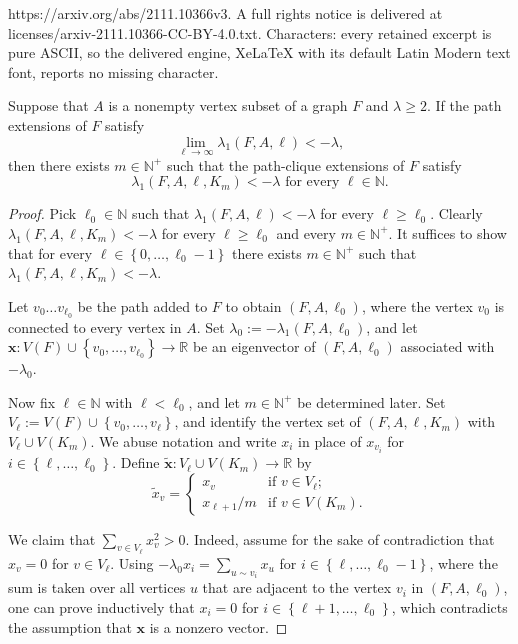 \documentclass[10pt,a4paper]{amsart}
\newcommand{\N}{\mathbb{N}}
\newcommand{\R}{\mathbb{R}}
\newcommand{\bx}{\bm{x}}
\newcommand{\la}{\lambda}
\newcommand{\sset}[1]{\left\{{#1}\right\}}
\newcommand{\tbx}{\tilde{\bx}}
\newcommand{\tx}{\tilde{x}}
\begin{document}
https://arxiv.org/abs/2111.10366v3. A full rights notice is delivered at licenses/arxiv-2111.10366-CC-BY-4.0.txt. Characters: every retained excerpt is pure ASCII, so the delivered engine, XeLaTeX with its default Latin Modern text font, reports no missing character.
\begin{lemma} \label{lem:path-clique-extension}
    Suppose that $A$ is a nonempty vertex subset of a graph $F$ and $\la \ge 2$. If the path extensions of $F$ satisfy
    \[
        \lim_{\ell\to\infty} \la_1(F, A, \ell) < -\la,
    \]
    then there exists $m \in \N^+$ such that the path-clique extensions of $F$ satisfy
    \[
        \la_1(F, A, \ell, K_m) < -\la \text{ for every }\ell \in \N.
    \]
\end{lemma}

\begin{proof}
    Pick $\ell_0 \in \N$ such that $\la_1(F, A, \ell) < -\la$ for every $\ell \ge \ell_0$. Clearly $\la_1(F, A, \ell, K_m) < -\la$ for every $\ell \ge \ell_0$ and every $m \in \N^+$. It suffices to show that for every $\ell \in \sset{0, \dots, \ell_0 - 1}$ there exists $m \in \N^+$ such that $\la_1(F, A, \ell, K_m) < -\la$.
    
    Let $v_0 \dots v_{\ell_0}$ be the path added to $F$ to obtain $(F, A, \ell_0)$, where the vertex $v_0$ is connected to every vertex in $A$. Set $\la_0 := -\la_1(F, A, \ell_0)$, and let $\bx \colon V(F) \cup \sset{v_0, \dots, v_{\ell_0}} \to \R$ be an eigenvector of $(F, A, \ell_0)$ associated with $-\la_0$.

    Now fix $\ell \in \N$ with $\ell < \ell_0$, and let $m \in \N^+$ be determined later. Set $V_\ell := V(F) \cup \sset{v_0, \dots, v_\ell}$, and identify the vertex set of $(F, A, \ell, K_m)$ with $V_\ell \cup V(K_m)$. We abuse notation and write $x_i$ in place of $x_{v_i}$ for $i \in \sset{\ell, \dots, \ell_0}$. Define $\tbx\colon V_\ell \cup V(K_m) \to \R$ by
    \[
        \tx_v = \begin{cases}
            x_v & \text{if }v \in V_\ell; \\
            x_{\ell+1}/m & \text{if }v \in V(K_m).
        \end{cases}
    \]
    
    We claim that $\sum_{v \in V_\ell}x_v^2 > 0$. Indeed, assume for the sake of contradiction that $x_v = 0$ for $v \in V_\ell$. Using $-\la_0x_i = \sum_{u\sim v_i}x_u$ for $i \in \sset{\ell, \dots, \ell_0-1}$, where the sum is taken over all vertices $u$ that are adjacent to the vertex $v_i$ in $(F, A, \ell_0)$, one can prove inductively that $x_i = 0$ for $i \in \sset{\ell + 1, \dots, \ell_0}$, which contradicts the assumption that $\bx$ is a nonzero vector.
    

\end{proof}
\end{document}

